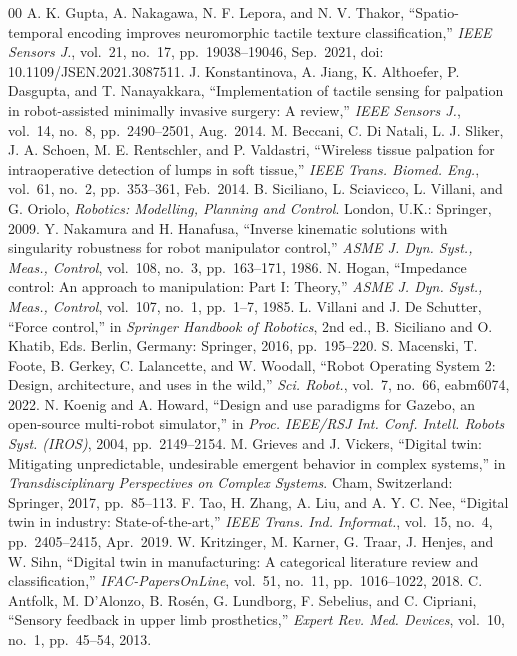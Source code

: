 \documentclass[conference]{IEEEtran}
\begin{document}
\begin{thebibliography}{00}
 A. K. Gupta, A. Nakagawa, N. F. Lepora, and N. V. Thakor,
``Spatio-temporal encoding improves neuromorphic tactile texture
classification,'' \emph{IEEE Sensors J.}, vol.~21, no.~17, pp.~19038--19046,
Sep.~2021, doi: 10.1109/JSEN.2021.3087511.
 J. Konstantinova, A. Jiang, K. Althoefer, P.
Dasgupta, and T. Nanayakkara, ``Implementation of tactile sensing for palpation
in robot-assisted minimally invasive surgery: A review,'' \emph{IEEE Sensors
J.}, vol.~14, no.~8, pp.~2490--2501, Aug.~2014.
 M. Beccani, C. Di Natali, L. J. Sliker, J. A. Schoen,
M. E. Rentschler, and P. Valdastri, ``Wireless tissue palpation for
intraoperative detection of lumps in soft tissue,'' \emph{IEEE Trans. Biomed.
Eng.}, vol.~61, no.~2, pp.~353--361, Feb.~2014.
 B. Siciliano, L. Sciavicco, L. Villani, and G. Oriolo,
\emph{Robotics: Modelling, Planning and Control}. London, U.K.: Springer, 2009.
 Y. Nakamura and H. Hanafusa, ``Inverse kinematic solutions
with singularity robustness for robot manipulator control,'' \emph{ASME J. Dyn.
Syst., Meas., Control}, vol.~108, no.~3, pp.~163--171, 1986.
 N. Hogan, ``Impedance control: An approach to manipulation:
Part I: Theory,'' \emph{ASME J. Dyn. Syst., Meas., Control}, vol.~107, no.~1,
pp.~1--7, 1985.
 L. Villani and J. De Schutter, ``Force control,'' in
\emph{Springer Handbook of Robotics}, 2nd ed., B. Siciliano and O. Khatib, Eds.
Berlin, Germany: Springer, 2016, pp.~195--220.
 S. Macenski, T. Foote, B. Gerkey, C. Lalancette, and W.
Woodall, ``Robot Operating System 2: Design, architecture, and uses in the
wild,'' \emph{Sci. Robot.}, vol.~7, no.~66, eabm6074, 2022.
 N. Koenig and A. Howard, ``Design and use paradigms for
Gazebo, an open-source multi-robot simulator,'' in \emph{Proc. IEEE/RSJ Int.
Conf. Intell. Robots Syst. (IROS)}, 2004, pp.~2149--2154.
 M. Grieves and J. Vickers, ``Digital twin: Mitigating
unpredictable, undesirable emergent behavior in complex systems,'' in
\emph{Transdisciplinary Perspectives on Complex Systems}. Cham, Switzerland:
Springer, 2017, pp.~85--113.
 F. Tao, H. Zhang, A. Liu, and A. Y. C. Nee, ``Digital twin in
industry: State-of-the-art,'' \emph{IEEE Trans. Ind. Informat.}, vol.~15, no.~4,
pp.~2405--2415, Apr.~2019.
 W. Kritzinger, M. Karner, G. Traar, J. Henjes, and
W. Sihn, ``Digital twin in manufacturing: A categorical literature review and
classification,'' \emph{IFAC-PapersOnLine}, vol.~51, no.~11, pp.~1016--1022, 2018.
 C. Antfolk, M. D'Alonzo, B. Ros\'en, G. Lundborg, F.
Sebelius, and C. Cipriani, ``Sensory feedback in upper limb prosthetics,''
\emph{Expert Rev. Med. Devices}, vol.~10, no.~1, pp.~45--54, 2013.
\end{thebibliography}
\end{document}
